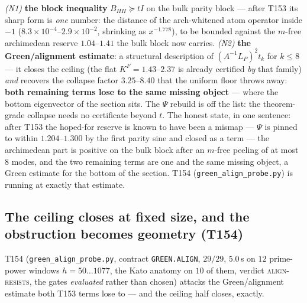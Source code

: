 \documentclass[11pt,a4paper]{article}
\begin{document}
\begin{keybox}
\emph{(N1)} \textbf{the block inequality} $B_{HH}\succeq tI$ on the bulk parity block ---
after T153 its sharp form is \emph{one} number: the distance of the arch-whitened atom
operator inside $-1$ ($8.3\times10^{-4}$--$2.9\times10^{-2}$, shrinking as $x^{-1.778}$), to
be bounded against the $m$-free archimedean reserve $1.04$--$1.41$ the bulk block now
carries. \emph{(N2)} \textbf{the Green/alignment estimate}: a structural description of
$(A^{-1}L_P)^2t_k$ for $k\le8$ --- it closes the ceiling (the flat $K^F=1.43$--$2.37$ is
already certified \emph{by} that family) \emph{and} recovers the collapse factor
$3.25$--$8.40$ that the uniform floor throws away: \textbf{both remaining terms lose to the
same missing object} --- where the bottom eigenvector of the section sits. The $\Psi$ rebuild
is off the list: the theorem-grade collapse needs no certificate beyond $t$. The honest
state, in one sentence: after T153 the hoped-for reserve is known to have been a mismap ---
$\Psi$ is pinned to within $1.204$--$1.300$ by the first parity sine and closed as a term ---
the archimedean part is positive on the bulk block after an $m$-free peeling of at most $8$
modes, and the two remaining terms are one and the same missing object, a Green estimate for
the bottom of the section.
T154 (\texttt{green\_align\_probe.py}) is running at exactly that estimate.
\end{keybox}

\subsection{The ceiling closes at fixed size, and the obstruction becomes geometry (T154)}
T154 (\texttt{green\_align\_probe.py}, contract \texttt{GREEN.ALIGN}, $29/29$, $5.0$\,s on
$12$ prime-power windows $h=50\ldots1077$, the Kato anatomy on $10$ of them, verdict
\textsc{align-resists}, the gates \emph{evaluated} rather than chosen) attacks the
Green/alignment estimate both T153 terms lose to --- and the ceiling half closes, exactly.
\end{document}
